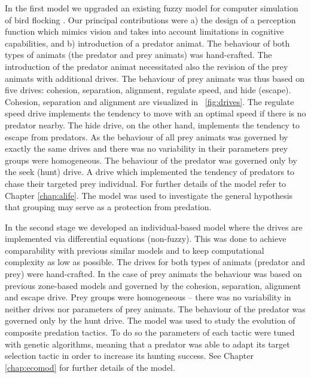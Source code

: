 In the first model we upgraded an existing fuzzy model for computer simulation of bird flocking \cite{lebarbajec2005fuzzy,lebarbajec2005simulating}. Our principal contributions were a) the design of a perception function which mimics vision and takes into account limitations in cognitive capabilities, and b) introduction of a predator animat. The behaviour of both types of animats (the predator and prey animats) was hand-crafted. The introduction of the predator animat necessitated also the revision of the prey animats with additional drives. The behaviour of prey animats was thus based on five drives: cohesion, separation, alignment, regulate speed, and hide (escape). Cohesion, separation and alignment are visualized in \figurename~\ref{fig:drives}. The regulate speed drive implements the tendency to move with an optimal speed if there is no predator nearby. The hide drive, on the other hand, implements the tendency to escape from predators. As the behaviour of all prey animats was governed by exactly the same drives and there was no variability in their parameters prey groups were homogeneous. The behaviour of the predator was governed only by the seek (hunt) drive. A drive which implemented the tendency of predators to chase their targeted prey individual. For further details of the model refer to Chapter \ref{chap:alife}. The model was used to investigate the general hypothesis that grouping may serve as a protection from predation.

In the second stage we developed an individual-based model where the drives are implemented via differential equations (non-fuzzy). This was done to achieve comparability with previous similar models and to keep computational complexity as low as possible. The drives for both types of animats (predator and prey) were hand-crafted. In the case of prey animats the behaviour was based on previous zone-based models \cite{aoki1982simulation,couzin2002collective} and governed by the cohesion, separation, alignment and escape drive. Prey groups were homogeneous -- there was no variability in neither drives nor parameters of prey animats. The behaviour of the predator was governed only by the hunt drive. The model was used to study the evolution of composite predation tactics. To do so the parameters of each tactic were tuned with genetic algorithms, meaning that a predator was able to adapt its target selection tactic in order to increase its hunting success. See Chapter \ref{chap:ecomod} for further details of the model.

